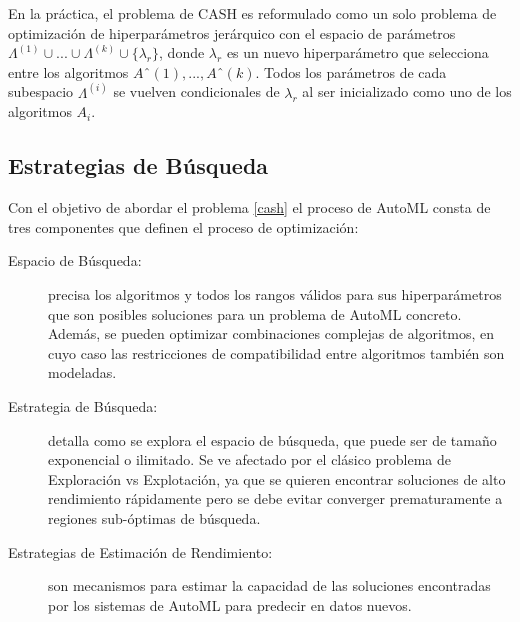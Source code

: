 
En la práctica, el problema de CASH es reformulado como un solo problema de optimización de hiperparámetros jerárquico con el espacio de parámetros $\Lambda^{(1)}\cup ... \cup \Lambda^{(k)} \cup\{\lambda_r\}$, donde $\lambda_r$ es un nuevo hiperparámetro que selecciona entre los algoritmos $Aˆ{(1)}, ..., Aˆ{(k)}$. Todos los parámetros de cada subespacio $\Lambda^{(i)}$ se vuelven condicionales de $\lambda_r$ al ser inicializado como uno de los algoritmos $A_i$.
 
\subsection{Estrategias de Búsqueda}\label{subsec:automl_methods}


Con el objetivo de abordar el problema \ref{cash} el proceso de AutoML consta de tres componentes que definen el proceso de optimización:

\begin{description}
	\item[Espacio de Búsqueda:] precisa los algoritmos y todos los rangos válidos para sus hiperparámetros que son posibles soluciones para un problema de AutoML concreto. Además, se pueden optimizar combinaciones complejas de algoritmos, en cuyo caso las restricciones de compatibilidad entre algoritmos también son modeladas.
	\item[Estrategia de Búsqueda:] detalla como se explora el espacio de búsqueda, que puede ser de tamaño exponencial o ilimitado. Se ve afectado por el clásico problema de Exploración vs Explotación, ya que se quieren encontrar soluciones de alto rendimiento rápidamente pero se debe evitar converger prematuramente a regiones sub-óptimas de búsqueda.
	\item[Estrategias de Estimación de Rendimiento:] son mecanismos para estimar la capacidad de las soluciones encontradas por los sistemas de AutoML para predecir en datos nuevos.
\end{description}

